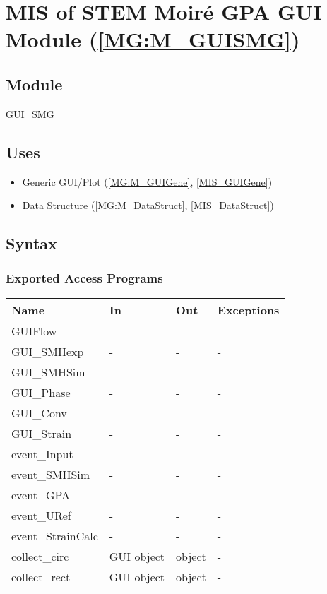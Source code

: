 \documentclass[12pt, titlepage]{article}
\begin{document}
\section{MIS of STEM Moir{\'e} GPA GUI Module (\texorpdfstring{\cref{MG:M_GUISMG}}))} \label{MIS_GUISMG}

\subsection{Module}
GUI{\_}SMG
\subsection{Uses}
\begin{itemize}
\item Generic GUI/Plot (\cref{MG:M_GUIGene}, \cref{MIS_GUIGene})
\item Data Structure (\cref{MG:M_DataStruct}, \cref{MIS_DataStruct})
\end{itemize}

\subsection{Syntax}

\subsubsection{Exported Access Programs}

\begin{center}
\begin{tabular}{p{4cm} p{2cm} p{2cm} p{2cm}}
\hline
\textbf{Name} & \textbf{In} & \textbf{Out} & \textbf{Exceptions} \\
\hline
GUIFlow & - & - & - \\
GUI{\_}SMHexp & - & - & - \\
GUI{\_}SMHSim & - & - & - \\
GUI{\_}Phase & - & - & - \\
GUI{\_}Conv & - & - & - \\
GUI{\_}Strain & - & - & - \\
event{\_}Input & - & - & - \\
event{\_}SMHSim & - & - & - \\
event{\_}GPA & - & - & - \\
event{\_}URef & - & - & - \\
event{\_}StrainCalc & - & - & - \\
collect{\_}circ & GUI object & object & - \\
collect{\_}rect & GUI object & object & -\\
\hline
\end{tabular}
\end{center}
\end{document}
